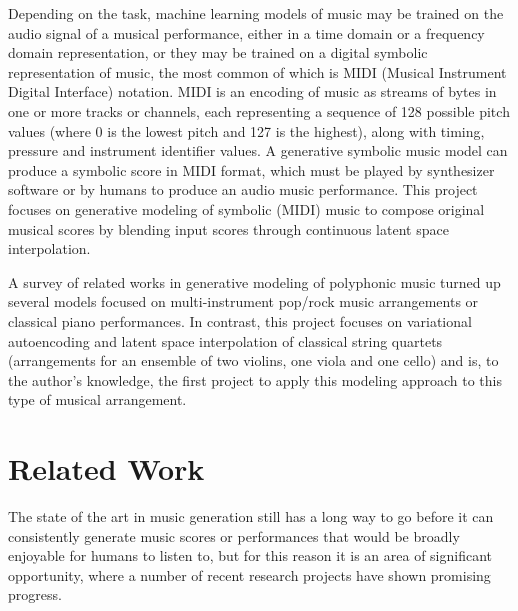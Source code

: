 \documentclass[sigconf,authorversion]{acmart}
\begin{document}
Depending on the task, machine learning models of music may be trained
on the audio signal of a musical performance, either in a time domain
or a frequency domain representation, or they may be trained on a
digital symbolic representation of music, the most common of which is
MIDI (Musical Instrument Digital Interface) notation. MIDI is an
encoding of music as streams of bytes in one or more tracks or
channels, each representing a sequence of 128 possible pitch values
(where 0 is the lowest pitch and 127 is the highest), along with
timing, pressure and instrument identifier values. A generative
symbolic music model can produce a symbolic score in MIDI format,
which must be played by synthesizer software or by humans to produce
an audio music performance. This project focuses on generative
modeling of symbolic (MIDI) music to compose original musical scores
by blending input scores through continuous latent space interpolation.

A survey of related works in generative modeling of polyphonic music
turned up several models focused on multi-instrument pop/rock music
arrangements or classical piano performances. In contrast, this
project focuses on variational autoencoding and latent space
interpolation of classical string quartets (arrangements for an
ensemble of two violins, one viola and one cello) and is, to the
author's knowledge, the first project to apply this modeling approach
to this type of musical arrangement.

\section{Related Work}

The state of the art in music generation still has a long way to go
before it can consistently generate music scores or performances that
would be broadly enjoyable for humans to listen to, but for this
reason it is an area of significant opportunity, where a number of
recent research projects have shown promising progress.
\end{document}
